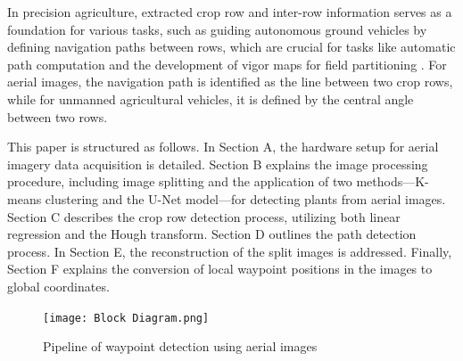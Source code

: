 \documentclass[conference]{IEEEtran}
\begin{document}
In precision agriculture, extracted crop row and inter-row information serves as a foundation for various tasks, such as guiding autonomous ground vehicles by defining navigation paths between rows, which are crucial for tasks like automatic path computation and the development of vigor maps for field partitioning \cite{b11}. For aerial images, the navigation path is identified as the line between two crop rows, while for unmanned agricultural vehicles, it is defined by the central angle between two rows\cite{b1}.

This paper is structured as follows. In Section A, the hardware setup for aerial imagery data acquisition is detailed. Section B explains the image processing procedure, including image splitting and the application of two methods—K-means clustering and the U-Net model—for detecting plants from aerial images. Section C describes the crop row detection process, utilizing both linear regression and the Hough transform. Section D outlines the path detection process. In Section E, the reconstruction of the split images is addressed. Finally, Section F explains the conversion of local waypoint positions in the images to global coordinates.

\begin{figure}[htbp]
\texttt{[image: Block Diagram.png]}
\caption{Pipeline of waypoint detection using aerial images}
\label{fig1}
\end{figure}
\end{document}

